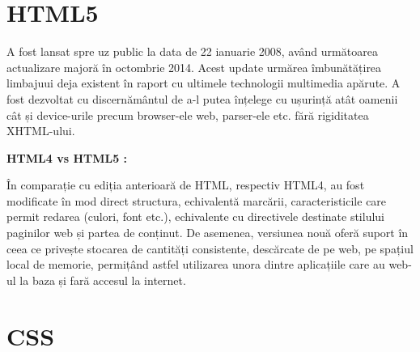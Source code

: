 \section{HTML5}
A fost lansat spre uz public la data de 22 ianuarie 2008, având următoarea actualizare majoră în octombrie 2014. Acest update urmărea îmbunătățirea limbajuui deja existent în raport cu ultimele technologii multimedia apărute. \newline
A fost dezvoltat cu discernământul de a-l putea înțelege cu ușurință atât oamenii cât și device-urile precum browser-ele web, parser-ele etc. fără rigiditatea XHTML-ului. \newline

\textbf{ HTML4 vs HTML5 :}\newline

În comparație cu ediția anterioară de HTML, respectiv HTML4, au fost modificate în mod direct structura, echivalentă marcării, caracteristicile care permit redarea (culori, font etc.), echivalente cu directivele destinate stilului paginilor web și partea de conținut. De asemenea, versiunea nouă  oferă suport în ceea ce privește stocarea de cantități consistente, descărcate de pe web, pe spațiul local de memorie, permițând astfel utilizarea unora dintre
aplicațiile care au web-ul la baza și fară accesul la internet.\newline\newline\newline\newline\newline

\section{CSS}
\label{chap:02}